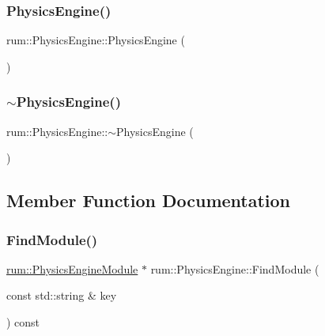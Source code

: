 \subsubsection{\texorpdfstring{Physics\+Engine()}{PhysicsEngine()}}
{\footnotesize\ttfamily rum\+::\+Physics\+Engine\+::\+Physics\+Engine (\begin{DoxyParamCaption}{ }\end{DoxyParamCaption})\hspace{0.3cm}{\ttfamily [explicit]}}

\mbox{\label{classrum_1_1_physics_engine_ad88a3f6114a8851c682de8b3c09c8da8}} 
\subsubsection{\texorpdfstring{$\sim$\+Physics\+Engine()}{~PhysicsEngine()}}
{\footnotesize\ttfamily rum\+::\+Physics\+Engine\+::$\sim$\+Physics\+Engine (\begin{DoxyParamCaption}{ }\end{DoxyParamCaption})}



\subsection{Member Function Documentation}
\mbox{\label{classrum_1_1_physics_engine_a2cb5a92d621c50d89764b93fbabcb2bd}} 
\subsubsection{\texorpdfstring{Find\+Module()}{FindModule()}}
{\footnotesize\ttfamily \hyperlink{classrum_1_1_physics_engine_module}{rum\+::\+Physics\+Engine\+Module} $\ast$ rum\+::\+Physics\+Engine\+::\+Find\+Module (\begin{DoxyParamCaption}\item[{const std\+::string \&}]{key }\end{DoxyParamCaption}) const}

